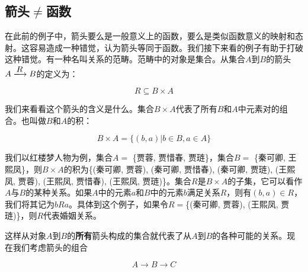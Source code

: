 \documentclass{article}
\begin{document}
\begin{Exercise}
\end{Exercise}

\subsection{箭头$\neq$函数}

在此前的例子中，箭头要么是一般意义上的函数，要么是类似函数意义的映射和态射。这容易造成一种错觉，认为箭头等同于函数。我们接下来看的例子有助于打破这种错觉。有一种名叫关系的范畴。范畴中的对象是集合。从集合$A$到$B$的箭头$A \arrowto{R} B$的定义为：

\[
R \subseteq B \times A
\]

我们来看看这个箭头的含义是什么。集合$B \times A$代表了所有$B$和$A$中元素对的组合。也叫做$B$和$A$的积：

\[
B \times A = \{(b, a) | b \in B, a \in A\}
\]

我们以红楼梦人物为例，集合$A =$ \{贾蓉, 贾惜春, 贾琏\}，集合$B =$ \{秦可卿, 王熙凤\}，则$B \times A$的积为\{(秦可卿, 贾蓉), (秦可卿, 贾惜春), (秦可卿, 贾琏), (王熙凤, 贾蓉), (王熙凤, 贾惜春), (王熙凤, 贾琏)\}。集合$R$是$B \times A$的子集，它可以看作$A$与$B$的某种关系。如果$A$中的元素$a$和$B$中的元素$b$满足关系$R$，则有$(b, a) \in R$，我们将其记为$bRa$。具体到这个例子，如果令$R=$\{(秦可卿, 贾蓉), (王熙凤, 贾琏)\}，则$R$代表婚姻关系。

这样从对象$A$到$B$的\textbf{所有}箭头构成的集合就代表了从$A$到$B$的各种可能的关系。现在我们考虑箭头的组合

\[
A \to B \to C
\]
\end{document}
